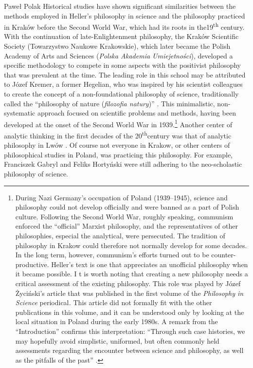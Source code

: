 \begin{artengenv}{Paweł Polak}
Historical studies have shown significant similarities between the methods employed in Heller’s philosophy in science
and the philosophy practiced in Kraków before the Second World War, which had its roots in the19\textsuperscript{th}
century. With the continuation of late-Enlightenment philosophy, the Kraków Scientific Society (Towarzystwo Naukowe
Krakowskie), which later became the Polish Academy of Arts and Sciences (\textit{Polska Akademia Umiejetności}),
developed a specific methodology to compete in some aspects with the positivist philosophy that was prevalent at the
time. The leading role in this school may be attributed to Józef Kremer, a former Hegelian, who was inspired by his
scientist colleagues to create the concept of a non-foundational philosophy of science, traditionally called the
``philosophy of nature (\textit{filozofia natury})''
\parencite{pol_polak_miedzy_2019}.
This minimalistic, non-systematic approach focused on
scientific problems and methods, having been developed at the onset of the Second World War in 1939.\footnote{During
Nazi Germany’s occupation of Poland (1939–1945), science and philosophy could not develop officially and were banned as
a part of Polish culture. Following the Second World War, roughly speaking, communism enforced the ``official'' Marxist
philosophy, and the representatives of other philosophies, especial the analytical, were persecuted. The tradition of
philosophy in Krakow could therefore not normally develop for some decades. In the long term, however, communism’s
efforts turned out to be counter-productive. Heller’s text is one that appreciates an unofficial philosophy when it
became possible. I t is worth noting that creating a new philosophy needs a critical assessment of the existing
philosophy. This role was played by Józef Życiński's article that was published in the first volume of the
\textit{Philosophy in Science }periodical\textit{.} This article did not formally fit with the other publications in
this volume, and it can be understood only by looking at the local situation in Poland during the early 1980s. A remark
from the ``Introduction'' confirms this interpretation: ``Through such case histories, we may hopefully avoid simplistic,
uniformed, but often commonly held assessments regarding the encounter between science and philosophy, as well as the
pitfalls of the past''
\parencite[p.19]{pol_heller_introduction_1983}.
} Another center of analytic
thinking in the first decades of the 20\textsuperscript{th}century was that of analytic philosophy in Lwów
\parencite{pol_polak_philosophy_2016,pol_wolenski_lvov-warsaw_2019}.
Of course not everyone in Krakow, or other centers of philosophical studies in Poland, was
practicing this philosophy. For example, Franciszek Gabryl and Feliks Hortyński were still adhering to the
neo-scholastic philosophy of science.


\end{artengenv}
